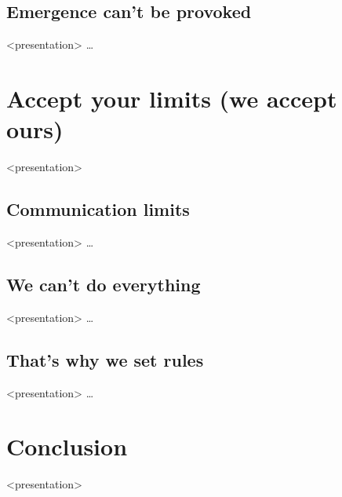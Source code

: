 %
\subsection{Emergence can't be provoked}

  \begin{frame}<presentation>%
    \dots
  \end{frame}

\section{Accept your limits (we accept ours)}

  \begin{frame}<presentation>
    \tableofcontents[currentsection]
  \end{frame}

%
\subsection{Communication limits}

  \begin{frame}<presentation>%
    \dots
  \end{frame}

%
\subsection{We can't do everything}

  \begin{frame}<presentation>%
    \dots
  \end{frame}

%
\subsection{That's why we set rules}

  \begin{frame}<presentation>%
    \dots
  \end{frame}

\section*{Conclusion}

  \begin{frame}<presentation>%
  \end{frame}

